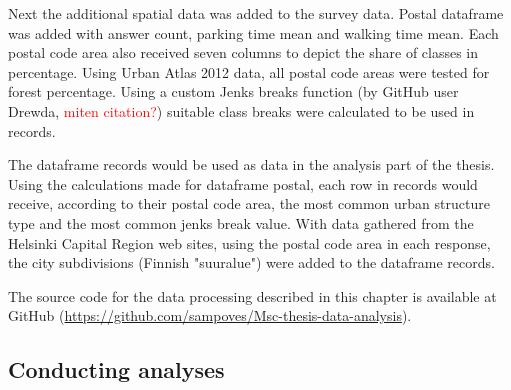 Next the additional spatial data was added to the survey data. Postal dataframe was added with answer count, parking time mean and walking time mean. Each postal code area also received seven columns to depict the share of classes in percentage. Using Urban Atlas 2012 data, all postal code areas were tested for forest percentage. Using a custom Jenks breaks function (by GitHub user Drewda, \textcolor{red}{miten citation?}) suitable class breaks were calculated to be used in records.

The dataframe records would be used as data in the analysis part of the thesis. Using the calculations made for dataframe postal, each row in records would receive, according to their postal code area, the most common urban structure type and the most common jenks break value. With data gathered from the Helsinki Capital Region web sites, using the postal code area in each response, the city subdivisions (Finnish "suuralue") were added to the dataframe records.

The source code for the data processing described in this chapter is available at GitHub (\textcolor{blue}{\url{https://github.com/sampoves/Msc-thesis-data-analysis}}).

\subsection{Conducting analyses}

